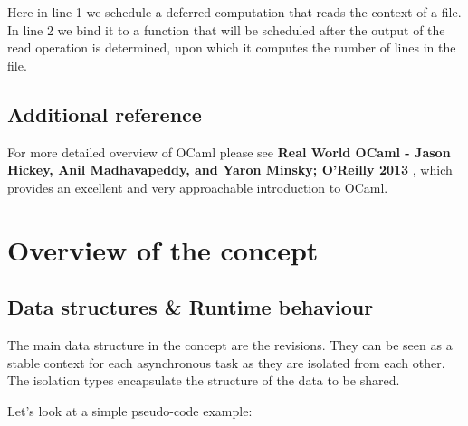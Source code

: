 \documentclass[12pt,twoside,notitlepage]{report}
\begin{document}
Here in line 1 we schedule a deferred computation that reads the context of a file. In line 2 we bind it to a function that will be scheduled after the output of the read operation is determined, upon which it computes the number of lines in the file.


\subsection{Additional reference}
For more detailed overview of OCaml please see {\bf Real World OCaml -  Jason Hickey, Anil Madhavapeddy, and Yaron Minsky; O'Reilly 2013} \cite{realocaml}, which provides an excellent and very approachable introduction to OCaml.
\vspace{12pt}
\section{Overview of the concept}


\subsection{Data structures \& Runtime behaviour }
\label{rev_data_struct}
\label{example}
The main data structure in the concept are the revisions. They can be seen as a stable context for each asynchronous task as they are isolated from each other. The isolation types encapsulate the structure of the data to be shared. 

Let's look at a simple pseudo-code example:

  
  
  
  
\end{document}
